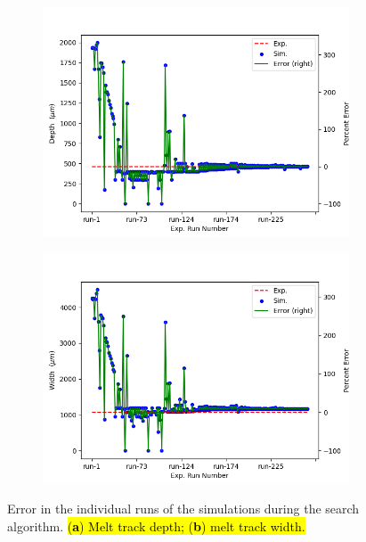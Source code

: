 \documentclass[metals,article,accept,pdftex,moreauthors]{Definitions/mdpi}
\begin{document}
\begin{figure}[H]
\begin{subfigure}[c]{0.475\textwidth}
\includegraphics[width=\textwidth]{tuning_error_depth_complete}
\caption{\centering}
\label{fig:tuning_error_depth_complete}
\end{subfigure}
\begin{subfigure}[c]{0.475\textwidth}
\includegraphics[width=\textwidth]{tuning_error_width_complete}
\caption{\centering}
\label{fig:tuning_error_width_complete}
\end{subfigure}
\caption{Error in the individual runs of the simulations during the search algorithm. 
\hl{(\textbf{a}) Melt track depth; (\textbf{b}) melt track width.}}
\label{fig:tuning_error_complete}
\end{figure}
\end{document}
